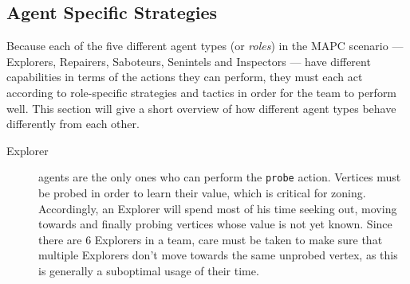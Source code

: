 \subsection{Agent Specific Strategies}\label{alg:agentstrategies}
Because each of the five different agent types (or \emph{roles}) in the MAPC scenario --- Explorers, Repairers, Saboteurs, Senintels and Inspectors --- have different capabilities in terms of the actions they can perform, they must each act according to role-specific strategies and tactics in order for the team to perform well.
This section will give a short overview of how different agent types behave differently from each other.
\begin{description}
    \item[Explorer] agents are the only ones who can perform the \texttt{probe} action.
        Vertices must be probed in order to learn their value, which is critical for zoning.
        Accordingly, an Explorer will spend most of his time seeking out, moving towards and finally probing vertices whose value is not yet known.
        Since there are 6 Explorers in a team, care must be taken to make sure that multiple Explorers don't move towards the same unprobed vertex, as this is generally a suboptimal usage of their time.
        

\end{description}
